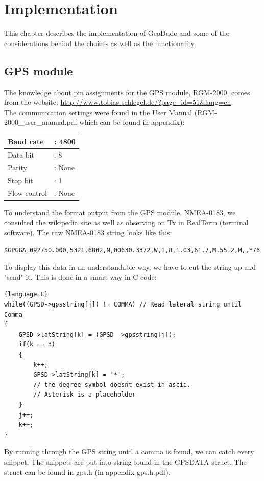\chapter{Implementation}
This chapter describes the implementation of GeoDude and some of the considerations behind the choices as well as the functionality.

\section{GPS module}
The knowledge about pin assignments for the GPS module, RGM-2000, comes from the website: \url{http://www.tobias-schlegel.de/?page_id=51&lang=en}.\\
The communication settings were found in the User Manual (RGM-2000\_user\_manual.pdf which can be found in appendix):
\begin{table}[H]
    \begin{tabular}{|ll|}
    \hline
    Baud rate    & : 4800 \\ \hline
    Data bit     & : 8    \\ \hline
    Parity       & : None \\ \hline
    Stop bit     & : 1    \\ \hline
    Flow control & : None \\ \hline
    \end{tabular}
\end{table}
To understand the format output from the GPS module, NMEA-0183, we consulted the wikipedia site as well as observing on Tx in RealTerm (terminal software). The raw NMEA-0183 string looks like this:
\begin{verbatim}
$GPGGA,092750.000,5321.6802,N,00630.3372,W,1,8,1.03,61.7,M,55.2,M,,*76
\end{verbatim}
To display this data in an understandable way, we have to cut the string up and "send" it. This is done in a smart way in C code:
\begin{lstlisting}{language=C}
while((GPSD->gpsstring[j]) != COMMA) // Read lateral string until Comma
{
	GPSD->latString[k] = (GPSD ->gpsstring[j]);
	if(k == 3)
	{
		k++;
		GPSD->latString[k] = '*';   
		// the degree symbol doesnt exist in ascii. 
		// Asterisk is a placeholder
	}
	j++;
	k++;
}
\end{lstlisting}
By running through the GPS string until a comma is found, we can catch every snippet. The snippets are put into string found in the GPSDATA struct. The struct can be found in gps.h (in appendix gps.h.pdf).

